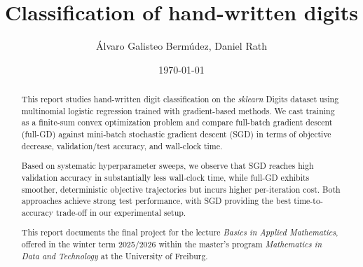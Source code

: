 \documentclass[12pt,a4paper,twoside]{amsart}  %
\title{Classification of hand-written digits}
\author{Álvaro Galisteo Bermúdez, Daniel Rath}
\date{\today}
\theoremstyle{plain}
\theoremstyle{definition}
\theoremstyle{remark}
\numberwithin{equation}{section} %
\begin{document}
	\begin{abstract}
	This report studies hand-written digit classification on the \emph{sklearn} Digits dataset using multinomial logistic regression trained with gradient-based methods. We cast training as a finite-sum convex optimization problem and compare full-batch gradient descent (full-GD) against mini-batch stochastic gradient descent (SGD) in terms of objective decrease, validation/test accuracy, and wall-clock time.

	Based on systematic hyperparameter sweeps, we observe that SGD reaches high validation accuracy in substantially less wall-clock time, while full-GD exhibits smoother, deterministic objective trajectories but incurs higher per-iteration cost. Both approaches achieve strong test performance, with SGD providing the best time-to-accuracy trade-off in our experimental setup.

	This report documents the final project for the lecture \emph{Basics in Applied Mathematics}, offered in the winter term 2025/2026 within the master’s program \emph{Mathematics in Data and Technology} at the University of Freiburg.
	\end{abstract}
	
	
    \maketitle
	\tableofcontents
	\newpage
    \restoregeometry
	
	
	
	
	\thispagestyle{empty}
	\printbibliography
\end{document}
